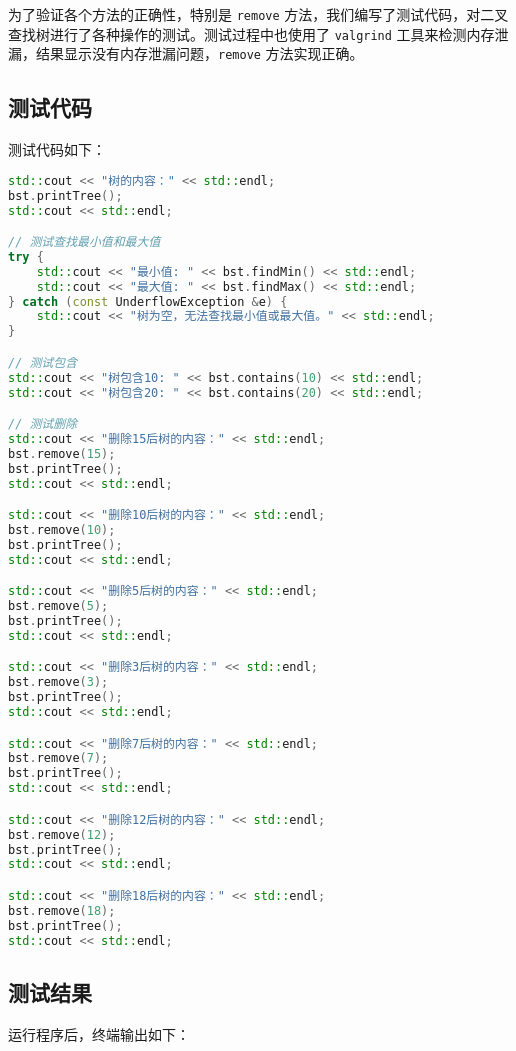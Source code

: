 \documentclass[UTF8]{ctexart}
\begin{document}
为了验证各个方法的正确性，特别是 \verb|remove| 方法，我们编写了测试代码，对二叉查找树进行了各种操作的测试。测试过程中也使用了 \verb|valgrind| 工具来检测内存泄漏，结果显示没有内存泄漏问题，\verb|remove| 方法实现正确。

\subsection{测试代码}

测试代码如下：

\begin{lstlisting}[language=C++, caption=测试代码]
std::cout << "树的内容：" << std::endl;
bst.printTree();
std::cout << std::endl;

// 测试查找最小值和最大值
try {
    std::cout << "最小值: " << bst.findMin() << std::endl;
    std::cout << "最大值: " << bst.findMax() << std::endl;
} catch (const UnderflowException &e) {
    std::cout << "树为空，无法查找最小值或最大值。" << std::endl;
}

// 测试包含
std::cout << "树包含10: " << bst.contains(10) << std::endl;
std::cout << "树包含20: " << bst.contains(20) << std::endl;

// 测试删除
std::cout << "删除15后树的内容：" << std::endl;
bst.remove(15);
bst.printTree();
std::cout << std::endl;

std::cout << "删除10后树的内容：" << std::endl;
bst.remove(10);
bst.printTree();
std::cout << std::endl;

std::cout << "删除5后树的内容：" << std::endl;
bst.remove(5);
bst.printTree();
std::cout << std::endl;

std::cout << "删除3后树的内容：" << std::endl;
bst.remove(3);
bst.printTree();
std::cout << std::endl;

std::cout << "删除7后树的内容：" << std::endl;
bst.remove(7);
bst.printTree();
std::cout << std::endl;

std::cout << "删除12后树的内容：" << std::endl;
bst.remove(12);
bst.printTree();
std::cout << std::endl;

std::cout << "删除18后树的内容：" << std::endl;
bst.remove(18);
bst.printTree();
std::cout << std::endl;
\end{lstlisting}

\subsection{测试结果}

运行程序后，终端输出如下：
\end{document}

